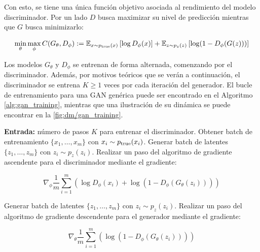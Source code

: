 Con esto, se tiene una única función objetivo asociada al rendimiento del modelo discriminador. Por un lado $D$ busca maximizar su nivel de predicción mientras que $G$ busca minimizarlo:

\begin{equation}
	\min_\theta\max_\phi C(G_\theta, D_\phi) := \mathbb{E}_{x\sim p_{\operatorname{true}}(x)}\left[\log D_\phi(x)\right] + \mathbb{E}_{z\sim p_z(z)}\left[\log (1-D_\phi(G(z)))\right]
	\label{eq:gan_objective}
\end{equation}

Los modelos $G_\theta$ y $D_\phi$ se entrenan de forma alternada, comenzando por el discriminador. Además, por motivos teóricos que se verán a continuación, el discriminador se entrena $K\geq 1$ veces por cada iteración del generador. El bucle de entrenamiento para una GAN genérica puede ser encontrado en el Algoritmo \ref{alg:gan_training}, mientras que una ilustración de su dinámica se puede encontrar en la \autoref{fig:dm/gan_training}.

\begin{algorithm}
	\caption{Entrenamiento de una GAN}
	\begin{algorithmic}[1]
		\State \textbf{Entrada:} número de pasos $K$ para entrenar el discriminador.
		\State Obtener batch de entrenamiento $\{x_1,\ldots,x_m\}$ con $x_i\sim p_{\operatorname{true}}(x_i)$.
		\State Generar batch de latentes $\{z_1,\ldots,z_m\}$ con $z_i\sim p_z(z_i)$.
		\State Realizar un paso del algoritmo de gradiente ascendente para el discriminador mediante el gradiente:

		\begin{equation}
			\nabla_\phi \frac{1}{m}\sum_{i=1}^m \left(\log D_\phi(x_i) + \log(1-D_\phi(G_\theta(z_i)))\right)
		\end{equation}

		\EndFor
		\State Generar batch de latentes $\{z_1,\ldots,z_m\}$ con $z_i\sim p_z(z_i)$.
		\State Realizar un paso del algoritmo de gradiente descendente para el generador mediante el gradiente:

		\begin{equation}
			\nabla_\theta \frac{1}{m}\sum_{i=1}^m \left( \log(1-D_\phi(G_\theta(z_i)))\right)
		\end{equation}

		\EndWhile
	\end{algorithmic}
	\label{alg:gan_training}
\end{algorithm}


